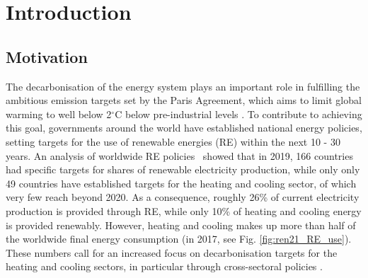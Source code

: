 \cleardoublepage
\chapter{Introduction}
\label{intro}


\section{Motivation}
\label{intro_motivation}


The decarbonisation of the energy system plays an important role in fulfilling the ambitious emission targets set by the Paris Agreement, which aims to limit global warming to well below 2$^\circ$C below pre-industrial levels \cite{rogelj_paris_2016}.
To contribute to achieving this goal, governments around the world have established national energy policies, setting targets for the use of renewable energies (RE) within the next 10 - 30 years. 
An analysis of worldwide RE policies~\cite{ren21_renewables_2020} showed that in 2019, 166 countries had specific targets for shares of renewable electricity production, while only only 49 countries have established targets for the heating and cooling sector, of which very few reach beyond 2020. 
As a consequence, roughly 26\% of current electricity production is provided through RE, while only 10\% of heating and cooling energy is provided renewably. However, heating and cooling makes up more than half of the worldwide final energy consumption (in 2017, see Fig. \ref{fig:ren21_RE_use}). These numbers call for an increased focus on decarbonisation targets for the heating and cooling sectors, in particular through cross-sectoral policies  \cite{ren21_renewables_2020}.

